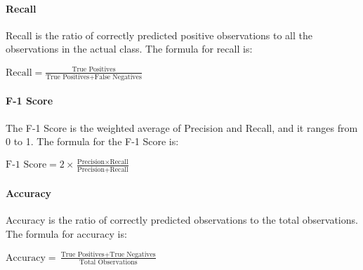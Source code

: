         \begin{minipage}{\dimexpr\linewidth-20pt}
            \paragraph{Recall}
            Recall is the ratio of correctly predicted positive observations to all the observations in the actual class. The formula for recall is:
            \par
            \vspace{2em}
            \begin{center}
                $
                \text{Recall} = \frac{\text{True Positives}}{\text{True Positives} + \text{False Negatives}}
                $
            \end{center}
            \vspace{1em}
        \end{minipage}
    
        \begin{minipage}{\dimexpr\linewidth-20pt}
            \paragraph{F-1 Score}
            The F-1 Score is the weighted average of Precision and Recall, and it ranges from 0 to 1. The formula for the F-1 Score is:
            \par
            \vspace{2em}
            \begin{center}
                $
                \text{F-1 Score} = 2 \times \frac{\text{Precision} \times \text{Recall}}{\text{Precision} + \text{Recall}}
                $
            \end{center}
            \vspace{1em}
        \end{minipage}
    
        \begin{minipage}{\dimexpr\linewidth-20pt}
            \paragraph{Accuracy}
            Accuracy is the ratio of correctly predicted observations to the total observations. The formula for accuracy is:
            \par
            \vspace{2em}
            \begin{center}
                $
                \text{Accuracy} = \frac{\text{True Positives} + \text{True Negatives}}{\text{Total Observations}}
                $
            \end{center}
            \vspace{1em}
        \end{minipage}

